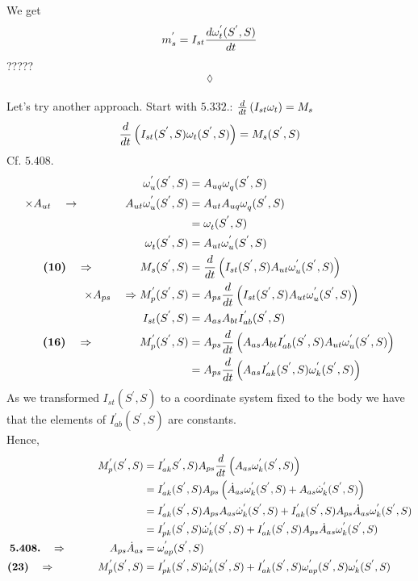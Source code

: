 We get $$ m^{'}_s = I_{st}\dv{\omega^{'}_{t}(S^{'},S)}{t}$$?????\\
$$\lozenge$$\\
\newpage
Let's try another approach. Start with $\mathbf{5.332.}$: $\dv{}{t}\left(I_{st}\omega_{t}\right)= M_s$
\begin{align}
\dv{}{t}\left(I_{st}(S^{'},S)\omega_{t}(S^{'},S)\right)= M_s(S^{'},S)
\end{align}
Cf. $\mathbf{5.408.}$
\begin{align}
\omega^{'}_{u}(S^{'},S)&=A_{uq}\omega^{}_{q}(S^{'},S)\\
\times A_{ut}\quad \rightarrow \quad\quad\quad\quad A_{ut}\omega^{'}_{u}(S^{'},S)&=A_{ut}A_{uq}\omega^{}_{q}(S^{'},S)\\
&=\omega^{}_{t}(S^{'},S)\\
\quad\quad\quad\quad \omega^{}_{t}(S^{'},S) &=  A_{ut}\omega^{'}_{u}(S^{'},S)\\
\textbf{(10)}\quad\Rightarrow\quad\quad\quad\quad M_s(S^{'},S) &=\dv{}{t}\left(I_{st}(S^{'},S)A_{ut}\omega^{'}_{u}(S^{'},S)\right)\\
\times A_{ps}\quad \Rightarrow M^{'}_p(S^{'},S) &=A_{ps}\dv{}{t}\left(I_{st}(S^{'},S)A_{ut}\omega^{'}_{u}(S^{'},S)\right)\\
I_{st}(S^{'},S)&= A_{as}A_{bt}I^{'}_{ab}(S^{'},S)\\
\textbf{(16)}\quad\Rightarrow \quad\quad\quad\quad M^{'}_p(S^{'},S) &=A_{ps}\dv{}{t}\left(A_{as}A_{bt}I^{'}_{ab}(S^{'},S)A_{ut}\omega^{'}_{u}(S^{'},S)\right)\\
&=A_{ps}\dv{}{t}\left(A_{as}I^{'}_{ak}(S^{'},S)\omega^{'}_{k}(S^{'},S)\right)
\end{align}
As we transformed $I_{st}(S^{'},S)$ to a coordinate system fixed to the body we have that the elements of $I^{'}_{ab}(S^{'},S)$ are constants.\\
Hence,
\begin{align}
 M^{'}_p(S^{'},S) &=I^{'}_{ak}S^{'},S)A_{ps}\dv{}{t}\left( A_{as}\omega^{'}_{k}(S^{'},S)\right)\\
 &=I^{'}_{ak}(S^{'},S)A_{ps}\left(\dot{A}_{as}\omega^{'}_{k}(S^{'},S)+A_{as} \dot{\omega}^{'}_{k}(S^{'},S)\right)\\
 &=I^{'}_{ak}(S^{'},S)A_{ps}A_{as} \dot{\omega}^{'}_{k}(S^{'},S)+ I^{'}_{ak}(S^{'},S)A_{ps}\dot{A}_{as}\omega^{'}_{k}(S^{'},S)\\
 &=I^{'}_{pk}(S^{'},S) \dot{\omega}^{'}_{k}(S^{'},S)+ I^{'}_{ak}(S^{'},S)A_{ps}\dot{A}_{as}\omega^{'}_{k}(S^{'},S)\\
\textbf{5.408.}\quad\Rightarrow \quad\quad\quad\quad  A_{ps}\dot{A}_{as} &= \omega^{'}_{ap}(S^{'},S)\\
\textbf{(23)}\quad\Rightarrow \quad\quad\quad\quad  M^{'}_p(S^{'},S) &=I^{'}_{pk}(S^{'},S) \dot{\omega}^{'}_{k}(S^{'},S)+ I^{'}_{ak}(S^{'},S)\omega^{'}_{ap}(S^{'},S)\omega^{'}_{k}(S^{'},S)
\end{align}
